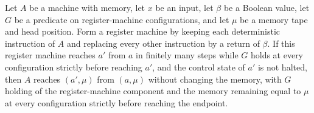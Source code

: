 \begin{lemma}
\label{Complexity.LogProg.MReach.of_areach}
\leanok
{}
Let $A$ be a machine with memory, let $x$ be an input, let $\beta$ be a Boolean value,
let $G$ be a predicate on register-machine configurations, and let $\mu$ be a memory
tape and head position. Form a register machine by keeping each deterministic
instruction of $A$ and replacing every other instruction by a return of $\beta$. If this
register machine reaches $a'$ from $a$ in finitely many steps while $G$ holds at every
configuration strictly before reaching $a'$, and the control state of $a'$ is not
halted, then $A$ reaches $(a',\mu)$ from $(a,\mu)$ without changing the memory, with $G$
holding of the register-machine component and the memory remaining equal to $\mu$ at
every configuration strictly before reaching the endpoint.
\end{lemma}
